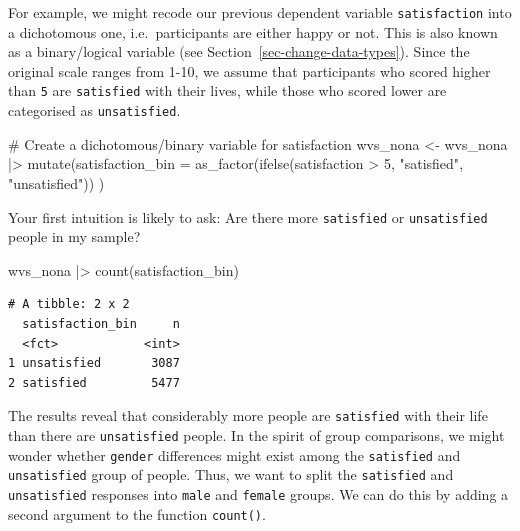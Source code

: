 \documentclass[
  letterpaper,
]{krantz}
\makeatletter
\newenvironment{Shaded}{\begin{snugshade}}{\end{snugshade}}
\newcommand{\AttributeTok}[1]{\textcolor[rgb]{0.40,0.45,0.13}{#1}}
\newcommand{\CommentTok}[1]{\textcolor[rgb]{0.37,0.37,0.37}{#1}}
\newcommand{\DecValTok}[1]{\textcolor[rgb]{0.68,0.00,0.00}{#1}}
\newcommand{\FunctionTok}[1]{\textcolor[rgb]{0.28,0.35,0.67}{#1}}
\newcommand{\NormalTok}[1]{\textcolor[rgb]{0.00,0.23,0.31}{#1}}
\newcommand{\OtherTok}[1]{\textcolor[rgb]{0.00,0.23,0.31}{#1}}
\newcommand{\SpecialCharTok}[1]{\textcolor[rgb]{0.37,0.37,0.37}{#1}}
\newcommand{\StringTok}[1]{\textcolor[rgb]{0.13,0.47,0.30}{#1}}
\newenvironment{kframe}{%
\medskip{}
\setlength{\fboxsep}{.8em}
 \def\at@end@of@kframe{}%
 \ifinner\ifhmode%
  \def\at@end@of@kframe{\end{minipage}}%
  \begin{minipage}{\columnwidth}%
 \fi\fi%
 \def\FrameCommand##1{\hskip\@totalleftmargin \hskip-\fboxsep
 \colorbox{shadecolor}{##1}\hskip-\fboxsep
     \hskip-\linewidth \hskip-\@totalleftmargin \hskip\columnwidth}%
 \MakeFramed {\advance\hsize-\width
   \@totalleftmargin\z@ \linewidth\hsize
   \@setminipage}}%
 {\par\unskip\endMakeFramed%
 \at@end@of@kframe}
\renewenvironment{Shaded}{\begin{kframe}}{\end{kframe}}
\makeatother
\begin{document}
For example, we might recode our previous dependent variable
\texttt{satisfaction} into a dichotomous one, i.e.~participants are
either happy or not. This is also known as a binary/logical variable
(see Section~\ref{sec-change-data-types}). Since the original scale
ranges from 1-10, we assume that participants who scored higher than
\texttt{5} are \texttt{satisfied} with their lives, while those who
scored lower are categorised as \texttt{unsatisfied}.

\begin{Shaded}
\begin{Highlighting}[]
\CommentTok{\# Create a dichotomous/binary variable for satisfaction}
\NormalTok{wvs\_nona }\OtherTok{\textless{}{-}}
\NormalTok{  wvs\_nona }\SpecialCharTok{|\textgreater{}}
  \FunctionTok{mutate}\NormalTok{(}\AttributeTok{satisfaction\_bin =} \FunctionTok{as\_factor}\NormalTok{(}\FunctionTok{ifelse}\NormalTok{(satisfaction }\SpecialCharTok{\textgreater{}} \DecValTok{5}\NormalTok{,}
                                             \StringTok{"satisfied"}\NormalTok{,}
                                             \StringTok{"unsatisfied"}\NormalTok{))}
\NormalTok{         )}
\end{Highlighting}
\end{Shaded}

Your first intuition is likely to ask: Are there more \texttt{satisfied}
or \texttt{unsatisfied} people in my sample?

\begin{Shaded}
\begin{Highlighting}[]
\NormalTok{wvs\_nona }\SpecialCharTok{|\textgreater{}} \FunctionTok{count}\NormalTok{(satisfaction\_bin)}
\end{Highlighting}
\end{Shaded}

\begin{verbatim}
# A tibble: 2 x 2
  satisfaction_bin     n
  <fct>            <int>
1 unsatisfied       3087
2 satisfied         5477
\end{verbatim}

The results reveal that considerably more people are \texttt{satisfied}
with their life than there are \texttt{unsatisfied} people. In the
spirit of group comparisons, we might wonder whether \texttt{gender}
differences might exist among the \texttt{satisfied} and
\texttt{unsatisfied} group of people. Thus, we want to split the
\texttt{satisfied} and \texttt{unsatisfied} responses into \texttt{male}
and \texttt{female} groups. We can do this by adding a second argument
to the function \texttt{count()}.
\end{document}
